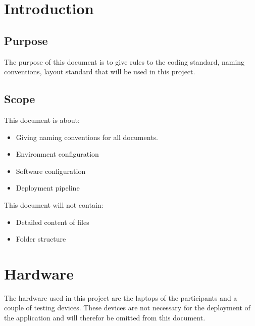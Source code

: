 \documentclass[12pt]{article}
\begin{document}
	\clearpage
	\printglossary[type=\acronymtype]
    \printglossary

	\clearpage

	\tableofcontents

	\clearpage
	\printglossaries
	
	\clearpage

	\section{Introduction}

	\subsection{Purpose}

	The purpose of this document is to give rules to the coding standard, naming conventions, layout standard that will be used in this project.

	\subsection{Scope}

	This document is about:

	\begin{itemize}
		\item Giving naming conventions for all documents.
		\item Environment configuration
		\item Software configuration
		\item Deployment pipeline
	\end{itemize}


	This document will not contain:

	\begin{itemize}
		\item Detailed content of files
		\item Folder structure
	\end{itemize}

	\clearpage
	\section{Hardware}

	The hardware used in this project are the laptops of the participants and a couple of testing devices. These devices are not necessary for the deployment of the application and will therefor be omitted from this document.
\end{document}
